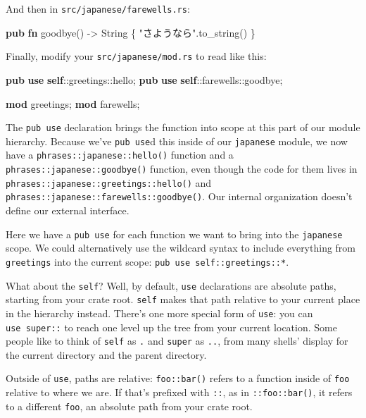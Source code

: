 \documentclass[a4paper,]{book}
\newenvironment{Shaded}{\begin{snugshade}}{\end{snugshade}}
\newcommand{\KeywordTok}[1]{\textcolor[rgb]{0.13,0.29,0.53}{\textbf{{#1}}}}
\newcommand{\DataTypeTok}[1]{\textcolor[rgb]{0.13,0.29,0.53}{{#1}}}
\newcommand{\StringTok}[1]{\textcolor[rgb]{0.31,0.60,0.02}{{#1}}}
\newcommand{\NormalTok}[1]{{#1}}
\begin{document}
And then in \texttt{src/japanese/farewells.rs}:

\begin{Shaded}
\begin{Highlighting}[]
\KeywordTok{pub} \KeywordTok{fn} \NormalTok{goodbye() -> }\DataTypeTok{String} \NormalTok{\{}
    \StringTok{"さようなら"}\NormalTok{.to_string()}
\NormalTok{\}}
\end{Highlighting}
\end{Shaded}

Finally, modify your \texttt{src/japanese/mod.rs} to read like this:

\begin{Shaded}
\begin{Highlighting}[]
\KeywordTok{pub} \KeywordTok{use} \KeywordTok{self}\NormalTok{::greetings::hello;}
\KeywordTok{pub} \KeywordTok{use} \KeywordTok{self}\NormalTok{::farewells::goodbye;}

\KeywordTok{mod} \NormalTok{greetings;}
\KeywordTok{mod} \NormalTok{farewells;}
\end{Highlighting}
\end{Shaded}

The \texttt{pub\ use} declaration brings the function into scope at this
part of our module hierarchy. Because we've \texttt{pub\ use}d this
inside of our \texttt{japanese} module, we now have a
\texttt{phrases::japanese::hello()} function and a
\texttt{phrases::japanese::goodbye()} function, even though the code for
them lives in \texttt{phrases::japanese::greetings::hello()} and
\texttt{phrases::japanese::farewells::goodbye()}. Our internal
organization doesn't define our external interface.

Here we have a \texttt{pub\ use} for each function we want to bring into
the \texttt{japanese} scope. We could alternatively use the wildcard
syntax to include everything from \texttt{greetings} into the current
scope: \texttt{pub\ use\ self::greetings::*}.

What about the \texttt{self}? Well, by default, \texttt{use}
declarations are absolute paths, starting from your crate root.
\texttt{self} makes that path relative to your current place in the
hierarchy instead. There's one more special form of \texttt{use}: you
can \texttt{use\ super::} to reach one level up the tree from your
current location. Some people like to think of \texttt{self} as
\texttt{.} and \texttt{super} as \texttt{..}, from many shells' display
for the current directory and the parent directory.

Outside of \texttt{use}, paths are relative: \texttt{foo::bar()} refers
to a function inside of \texttt{foo} relative to where we are. If that's
prefixed with \texttt{::}, as in \texttt{::foo::bar()}, it refers to a
different \texttt{foo}, an absolute path from your crate root.
\end{document}
